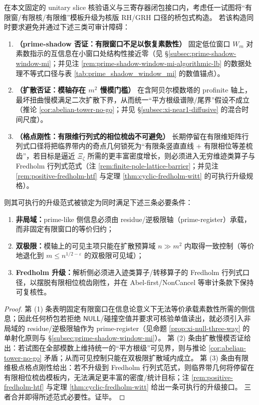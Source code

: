 \begin{theorem}\label{thm:bridge-paradigm-nonlocal-doublelimit-fredholm}
在本文固定的 unitary slice 核验语义与三寄存器闭包接口内，考虑任一试图将“有限窗/有限核/有限维”模板升级为核版 RH/GRH 口径的桥包式构造。
若该构造同时要求避免并通过下述三类可审计障碍：
\begin{enumerate}
  \item \textbf{（prime-shadow 否证：有限窗口不足以恢复素数性）}
  固定低位窗口 \(W_m\) 对素数指示的互信息在小窗口处结构性接近零（见 \S\ref{subsec:prime-shadow-window-mi}；并见注 \ref{rem:prime-shadow-window-mi-algorithmic-lb} 的数据处理不等式口径与表 \ref{tab:prime_shadow_window_mi} 的数值锚点）。
  \item \textbf{（扩散否证：模轴存在 \(m^2\) 慢模门槛）}
  在含阿贝尔模数塔的 profinite 轴上，最坏扭曲慢模满足二次扩散下界，从而统一“平方根级谱隙/尾界”假设不成立（推论 \ref{cor:abelian-tower-no-go}；并见 \S\ref{subsec:xi-near1-diffusive} 的混合时间尺度）。
  \item \textbf{（格点刚性：有限维行列式的相位梳齿不可避免）}
  长期停留在有限维矩阵行列式口径将把临界带内的奇点几何锁死为“有限条竖直直线 + 有限相位等差梳齿”，若目标是逼近 \(\Xi_\zeta\) 所需的更丰富密度增长，则必须进入无穷维迹类算子与 Fredholm 行列式范式（注 \ref{rem:finite-pole-lattice-barrier}；并见注 \ref{rem:positive-fredholm-htf} 与定理 \ref{thm:cyclic-fredholm-witt} 的可执行升级规格）。
\end{enumerate}
则其可执行的升级范式被锁定为同时满足下述三条必要条件：
\begin{enumerate}
  \item \textbf{非局域：}prime-like 侧信息必须由 residue/逆极限轴（prime-register）承载，而非固定有限窗口的等价归约；
  \item \textbf{双极限：}模轴上的可见主项只能在扩散预算域 \(n\gg m^2\) 内取得一致控制（等价地退化到 \(m\le n^{1/2-\varepsilon}\) 的双极限可见域）；
  \item \textbf{Fredholm 升级：}解析侧必须进入迹类算子/转移算子的 Fredholm 行列式口径，以摆脱有限相位梳齿刚性，并在 Abel-first/NonCancel 等审计条款下保持可复核性。
\end{enumerate}
\end{theorem}

\begin{proof}
第 (1) 条表明固定有限窗口在信息论意义下无法等价承载素数性所需的侧信息；因此任何桥包若拒绝 \(\mathsf{NULL}\)/碰撞空值并要求可核验单值读出，就必须引入非局域的 residue/逆极限轴作为 prime-register（见命题 \ref{prop:xi-null-three-way} 的单射化原则与 \S\ref{subsec:prime-shadow-window-mi}）。
第 (2) 条由扩散慢模否证给出：若试图在全部模数上维持统一的“平方根级”可见界，则与推论 \ref{cor:abelian-tower-no-go} 矛盾；从而可见控制只能在双极限扩散域内成立。
第 (3) 条由有限维极点格点刚性给出：若不升级到 Fredholm 行列式范式，则临界带几何将停留在有限相位梳齿模板内，无法满足更丰富的密度/统计目标；注 \ref{rem:positive-fredholm-htf} 与定理 \ref{thm:cyclic-fredholm-witt} 给出一条可执行的升级接口。
三者合并即得所述范式必要性。证毕。
\end{proof}

